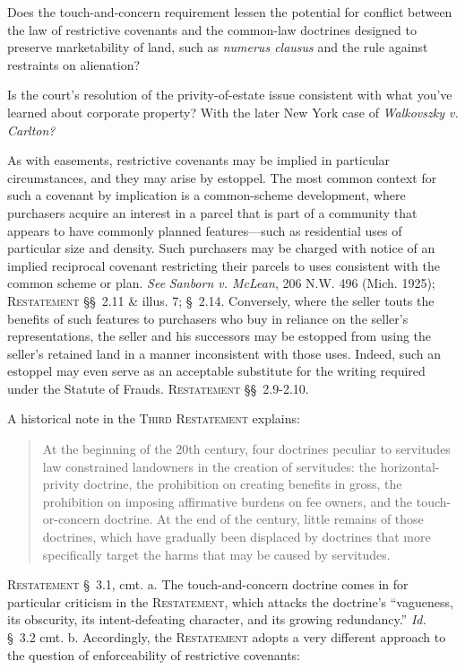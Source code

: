
\item Does the touch-and-concern requirement lessen the potential for conflict
between the law of restrictive covenants and the common-law doctrines designed
to preserve marketability of land, such as \textit{numerus clausus} and the rule
against restraints on alienation?

\item Is the court's resolution of the privity-of-estate issue consistent with
what you've learned about corporate property? With the later New York case of
\textit{Walkovszky v. Carlton?}

\item As with easements, restrictive covenants may be implied in particular
circumstances, and they may arise by estoppel. The most common context for such
a covenant by implication is a common-scheme development, where purchasers
acquire an interest in a parcel that is part of a community that appears to have
commonly planned features---such as residential uses of particular size and
density. Such purchasers may be charged with notice of an implied reciprocal
covenant restricting their parcels to uses consistent with the common scheme or
plan. \textit{See} \emph{Sanborn v. McLean}, 206 N.W. 496 (Mich. 1925);
\textsc{Restatement} \S\S~2.11 \& illus. 7; \S~2.14. Conversely, where the
seller touts
the benefits of such features to purchasers who buy in reliance on the seller's
representations, the seller and his successors may be estopped from using the
seller's retained land in a manner inconsistent with those uses. Indeed, such an
estoppel may even serve as an acceptable substitute for the writing required
under the Statute of Frauds. \textsc{Restatement} \S\S~2.9-2.10.

\item A historical note in the \textsc{Third Restatement} explains: 
\begin{quote}
At the beginning of the 20th century, four doctrines peculiar to servitudes law
constrained landowners in the creation of servitudes: the horizontal-privity
doctrine, the prohibition on creating benefits in gross, the prohibition on
imposing affirmative burdens on fee owners, and the touch-or-concern doctrine.
At the end of the century, little remains of those doctrines, which have
gradually been displaced by doctrines that more specifically target the harms
that may be caused by servitudes. 
\end{quote}
\textsc{Restatement} \S~3.1, cmt. a. The touch-and-concern doctrine comes in for
particular criticism in the \textsc{Restatement}, which attacks the doctrine's
``vagueness, its obscurity, its intent-defeating character, and its growing
redundancy.'' \textit{Id.} \S~3.2 cmt. b. Accordingly, the \textsc{Restatement}
adopts a
very different approach to the question of enforceability of restrictive
covenants:

